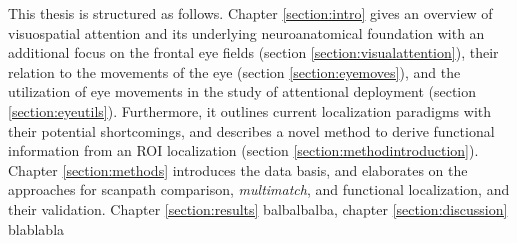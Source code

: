 \documentclass[a4paper, 12pt]{scrreprt}
\begin{document}
This thesis is structured as follows. Chapter \ref{section:intro} gives an overview of visuospatial attention and its underlying neuroanatomical foundation with an additional focus on the frontal eye fields (section \ref{section:visualattention}), their relation to the movements of the eye (section \ref{section:eyemoves}), and the utilization of eye movements in the study of attentional deployment (section \ref{section:eyeutils}). Furthermore, it outlines current localization paradigms with their potential shortcomings, and describes a novel method to derive functional information from an ROI localization (section \ref{section:methodintroduction}). Chapter \ref{section:methods} introduces the data basis, and elaborates on the approaches for scanpath comparison, \textit{multimatch}, and functional localization, and their validation. Chapter \ref{section:results} balbalbalba, chapter \ref{section:discussion} blablabla
\pagebreak
\end{document}
